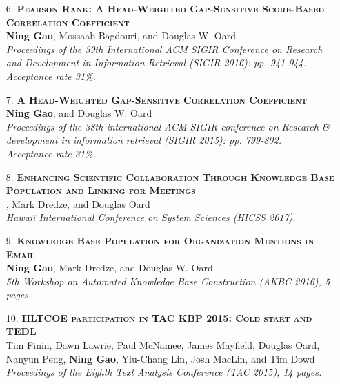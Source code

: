 \documentclass[a4paper, 11pt]{article}
\begin{document}
\begin{itemize}
\item[\color{bl3} 6.]{\scshape\color{bl3}\bf Pearson Rank: A Head-Weighted Gap-Sensitive Score-Based Correlation Coefficient}\\
{\color{black} \textbf{Ning Gao}, Mossaab Bagdouri, and Douglas W. Oard \\
\emph{Proceedings of the 39th International ACM SIGIR Conference on Research and Development in Information Retrieval (SIGIR 2016): pp. 941-944.\\ Acceptance rate 31\%.}}
\vspace{2mm}



\item[\color{bl3} 7.]{\scshape\color{bl3}\bf A Head-Weighted Gap-Sensitive Correlation Coefficient}\\
{\color{black} \textbf{Ning Gao}, and Douglas W. Oard} \\
\emph{Proceedings of the 38th international ACM SIGIR conference on Research \& development in information retrieval (SIGIR 2015): pp. 799-802.\\ Acceptance rate 31\%.}
\vspace{2mm}

\item[\color{bl3} 8.]{\scshape\color{bl3}\bf Enhancing Scientific Collaboration Through Knowledge Base Population and Linking for Meetings}\\
, Mark Dredze, and Douglas Oard\\
\emph{Hawaii International Conference on System Sciences (HICSS 2017).}
\vspace{2mm}

\item[\color{bl3} 9.]{\scshape\color{bl3}\bf Knowledge Base Population for Organization Mentions in Email}\\
{\color{black} \textbf{Ning Gao}, Mark Dredze, and Douglas W. Oard \\
\emph{5th Workshop on Automated Knowledge Base Construction (AKBC 2016), 5 pages.}}
\vspace{2mm}

\item[\color{bl3} 10.]{\scshape\color{bl3}\bf HLTCOE participation in TAC KBP 2015: Cold start and TEDL}\\
{\color{black}Tim Finin, Dawn Lawrie, Paul McNamee, James Mayfield, Douglas Oard, Nanyun Peng, \textbf{Ning Gao}, Yiu-Chang Lin, Josh MacLin, and Tim Dowd \\
\emph{Proceedings of the Eighth Text Analysis Conference (TAC 2015), 14 pages.}}
\vspace{2mm}





\end{itemize}
\end{document}

